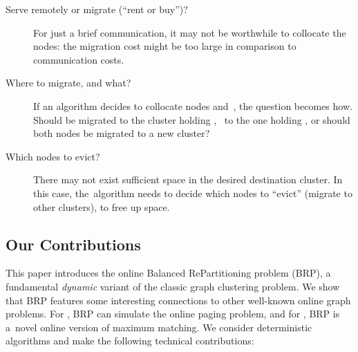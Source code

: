 \documentclass{siamart190516}
\begin{document}
\begin{description}

\item[Serve remotely or migrate (``rent or buy'')?] For just a brief communication, it may not be worthwhile to collocate the nodes: the migration cost might
be too large in comparison to communication costs.

\item[Where to migrate, and what?]
If an algorithm decides to collocate nodes  and~, the question becomes
how. Should  be migrated to the cluster holding , ~to the one holding
, or should both nodes be migrated to a new cluster?

\item[Which nodes to evict?]
There may not exist sufficient space in the desired destination cluster. In
this case, the~algorithm needs to decide which nodes to ``evict'' (migrate to
other clusters), to free up space.

\end{description}


\subsection{Our Contributions}

This paper introduces the online Balanced RePartitioning problem (BRP),
a fundamental \emph{dynamic} variant of the classic graph clustering problem. 
We show that BRP features some interesting connections to other well-known
online graph problems. For , BRP can simulate the online paging problem,
and for , BRP is a~novel online version of maximum matching.
We consider deterministic algorithms and make the following technical
contributions:
\end{document}
